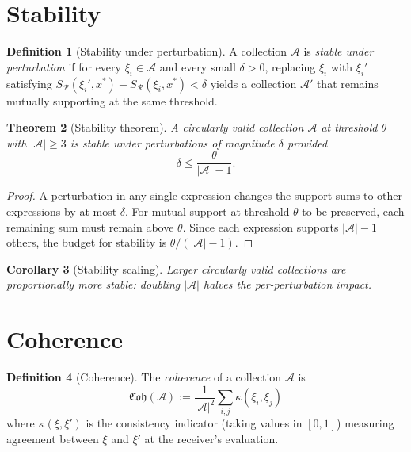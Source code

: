 \documentclass[twocolumn,11pt,a4paper]{article}
\theoremstyle{thmstyle}
\newtheorem{theorem}{Theorem}[section]
\newtheorem{corollary}[theorem]{Corollary}
\theoremstyle{thmstyle}
\theoremstyle{definition}
\newtheorem{definition}[theorem]{Definition}
\theoremstyle{remark}
\newcommand{\Ax}{\mathcal{A}}
\newcommand{\Cohere}{\mathfrak{Coh}}
\newcommand{\receiver}{\mathcal{R}}
\newcommand{\Sscalar}{S}
\begin{document}
\section{Stability}
\label{sec:stability}

\begin{definition}[Stability under perturbation]
\label{def:stability}
A collection $\Ax$ is \emph{stable under perturbation}
if for every $\xi_{i} \in \Ax$ and every small
$\delta > 0$, replacing $\xi_{i}$ with $\xi_{i}'$
satisfying $\Sscalar_{\receiver}(\xi_{i}', x^{*}) -
\Sscalar_{\receiver}(\xi_{i}, x^{*}) < \delta$ yields
a collection $\Ax'$ that remains mutually supporting
at the same threshold.
\end{definition}

\begin{theorem}[Stability theorem]\label{thm:stability}
A circularly valid collection $\Ax$ at threshold
$\theta$ with $|\Ax| \geq 3$ is stable under
perturbations of magnitude $\delta$ provided
\[
\delta \leq \frac{\theta}{|\Ax| - 1}.
\]
\end{theorem}

\begin{proof}
A perturbation in any single expression changes the
support sums to other expressions by at most
$\delta$.  For mutual support at threshold $\theta$
to be preserved, each remaining sum must remain
above $\theta$.  Since each expression supports
$|\Ax| - 1$ others, the budget for stability is
$\theta / (|\Ax| - 1)$.
\end{proof}

\begin{corollary}[Stability scaling]\label{cor:stability-scaling}
Larger circularly valid collections are
proportionally more stable: doubling $|\Ax|$ halves
the per-perturbation impact.
\end{corollary}

\section{Coherence}
\label{sec:coherence}

\begin{definition}[Coherence]\label{def:coherence}
The \emph{coherence} of a collection $\Ax$ is
\[
\Cohere(\Ax)
:= \frac{1}{|\Ax|^{2}}
   \sum_{i, j} \kappa(\xi_{i}, \xi_{j})
\]
where $\kappa(\xi, \xi')$ is the consistency
indicator (taking values in $[0, 1]$) measuring
agreement between $\xi$ and $\xi'$ at the
receiver's evaluation.
\end{definition}
\end{document}
